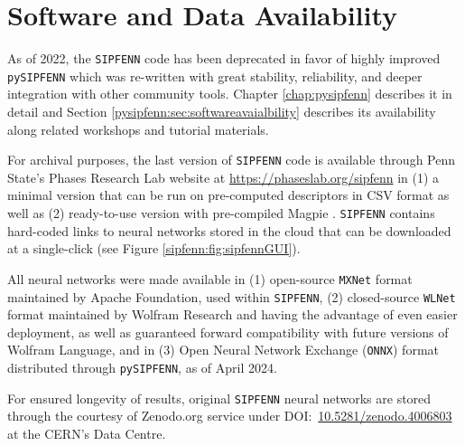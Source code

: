 \section{Software and Data Availability}

As of 2022, the \texttt{SIPFENN} code has been deprecated in favor of highly improved \texttt{pySIPFENN} which was re-written with great stability, reliability, and deeper integration with other community tools. Chapter \ref{chap:pysipfenn} describes it in detail and Section \ref{pysipfenn:sec:softwareavaialbility} describes its availability along related workshops and tutorial materials.

For archival purposes, the last version of \texttt{SIPFENN} code is available through Penn State's Phases Research Lab website at 
\href{https://phaseslab.org/sipfenn}{https://phaseslab.org/sipfenn} in (1) a minimal version that can be run on pre-computed descriptors in CSV format as well as (2) ready-to-use version with pre-compiled Magpie \cite{Ward2016AMaterials}. \texttt{SIPFENN} contains hard-coded links to neural networks stored in the cloud that can be downloaded at a single-click (see Figure \ref{sipfenn:fig:sipfennGUI}). 

All neural networks were made available in (1) open-source \texttt{MXNet} format maintained by Apache Foundation, used within \texttt{SIPFENN}, (2) closed-source \texttt{WLNet} format maintained by Wolfram Research and having the advantage of even easier deployment, as well as guaranteed forward compatibility with future versions of Wolfram Language, and in (3) Open Neural Network Exchange (\texttt{ONNX}) format \cite{Bai2019ONNX:Exchange} distributed through \texttt{pySIPFENN}, as of April 2024.

For ensured longevity of results, original \texttt{SIPFENN} neural networks are stored through the courtesy of Zenodo.org service under DOI:~\href{https://doi.org/10.5281/zenodo.4006803}{10.5281/zenodo.4006803} at the CERN’s Data Centre.

\pagebreak


